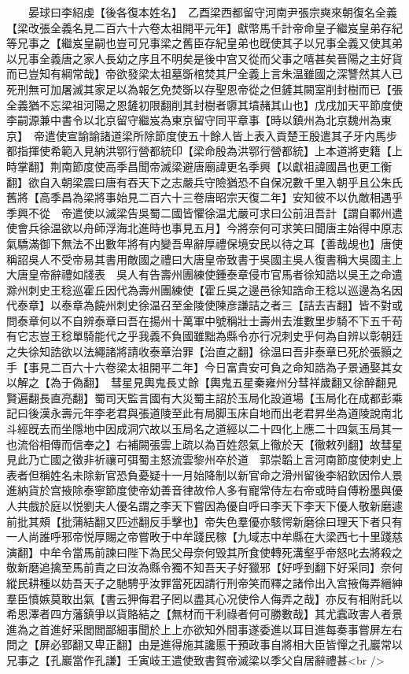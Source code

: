 　　晏球曰李紹虔【後各復本姓名】　乙酉梁西都留守河南尹張宗奭來朝復名全義【梁改張全義名見二百六十六卷太祖開平元年】獻幣馬千計帝命皇子繼岌皇弟存紀等兄事之【繼岌皇嗣也豈可兄事梁之舊臣存紀皇弟也旣使其子以兄事全義又使其弟以兄事全義唐之家人長幼之序且不明矣是後中宫又從而父事之嘻甚矣晉陽之主好貨而已豈知有綱常哉】帝欲發梁太祖墓斲棺焚其尸全義上言朱温雖國之深讐然其人已死刑無可加屠滅其家足以為報乞免焚斲以存聖恩帝從之但鏟其闕室削封樹而已【張全義猶不忘梁祖河陽之恩鏟初限翻削其封樹者隳其墳赭其山也】戊戌加天平節度使李嗣源兼中書令以北京留守繼岌為東京留守同平章事【時以鎮州為北京魏州為東京】　帝遣使宣諭諭諸道梁所除節度使五十餘人皆上表入貢楚王殷遣其子牙内馬步都指揮使希範入見納洪鄂行營都統印【梁命殷為洪鄂行營都統】上本道將吏籍【上時掌翻】荆南節度使高季昌聞帝滅梁避唐廟諱更名季興【以獻祖諱國昌也更工衡翻】欲自入朝梁震曰唐有吞天下之志嚴兵守險猶恐不自保况數千里入朝乎且公朱氏舊將【高季昌為梁將事始見二百六十三卷唐昭宗天復二年】安知彼不以仇敵相遇乎季興不從　帝遣使以滅梁告吳蜀二國皆懼徐温尤嚴可求曰公前沮吾計【謂自鄆州遣使會兵徐温欲以舟師浮海北進時也事見五月】今將奈何可求笑曰聞唐主始得中原志氣驕滿御下無法不出數年將有内變吾卑辭厚禮保境安民以待之耳【善哉覘也】唐使稱詔吳人不受帝易其書用敵國之禮曰大唐皇帝致書于吳國主吳人復書稱大吳國主上大唐皇帝辭禮如牋表　吳人有告壽州團練使鍾泰章侵市官馬者徐知誥以吳王之命遣滁州刺史王稔巡霍丘因代為壽州團練使【霍丘吳之邊邑徐知誥命王稔以巡邊為名因代泰章】以泰章為饒州刺史徐温召至金陵使陳彦謙詰之者三【詰去吉翻】皆不對或問泰章何以不自辨泰章曰吾在揚州十萬軍中號稱壯士壽州去淮數里步騎不下五千苟有它志豈王稔單騎能代之乎我義不負國雖黜為縣令亦行况刺史乎何為自辨以彰朝廷之失徐知誥欲以法繩諸將請收泰章治罪【治直之翻】徐温曰吾非泰章已死於張顥之手【事見二百六十六卷梁太祖開平二年】今日富貴安可負之命知誥為子景通娶其女以解之【為于偽翻】　彗星見輿鬼長丈餘【輿鬼五星秦雍州分彗祥歲翻又徐醉翻見賢遍翻長直亮翻】蜀司天監言國有大災蜀主詔於玉局化設道場【玉局化在成都彭乘記曰後漢永壽元年李老君與張道陵至此有局脚玉床自地而出老君昇坐為道陵說南北斗經旣去而坐隱地中因成洞穴故以玉局名之道經以二十四化上應二十四氣玉局其一也流俗相傳而信奉之】右補闕張雲上疏以為百姓怨氣上徹於天【徹敕列翻】故彗星見此乃亡國之徵非祈禳可弭蜀主怒流雲黎州卒於道　郭崇韜上言河南節度使刺史上表者但稱姓名未除新官恐負憂疑十一月始降制以新官命之滑州留後李紹欽因伶人景進納貨於宫掖除泰寧節度使帝幼善音律故伶人多有寵常侍左右帝或時自傅粉墨與優人共戲於庭以悦劉夫人優名謂之李天下嘗因為優自呼曰李天下李天下優人敬新磨遽前批其頰【批蒲結翻又匹述翻反手擊也】帝失色羣優亦駭愕新磨徐曰理天下者只有一人尚誰呼邪帝悦厚賜之帝嘗畋于中牟踐民稼【九域志中牟縣在大梁西七十里踐慈演翻】中牟令當馬前諫曰陛下為民父母奈何毁其所食使轉死溝壑乎帝怒叱去將殺之敬新磨追擒至馬前責之曰汝為縣令獨不知吾天子好獵邪【好呼到翻下好采同】奈何縱民耕種以妨吾天子之馳騁乎汝罪當死因請行刑帝笑而釋之諸伶出入宫掖侮弄縉紳羣臣憤嫉莫敢出氣【書云狎侮君子罔以盡其心况使伶人侮弄之哉】亦反有相附託以希恩澤者四方藩鎮爭以貨賂結之【無材而干利祿者何可勝數哉】其尤蠧政害人者景進為之首進好采閭閻鄙細事聞於上上亦欲知外間事遂委進以耳目進每奏事嘗屏左右問之【屏必郢翻又卑正翻】由是進得施其讒慝干預政事自將相大臣皆憚之孔巖常以兄事之【孔巖當作孔謙】壬寅岐王遣使致書賀帝滅梁以季父自居辭禮甚<br />
